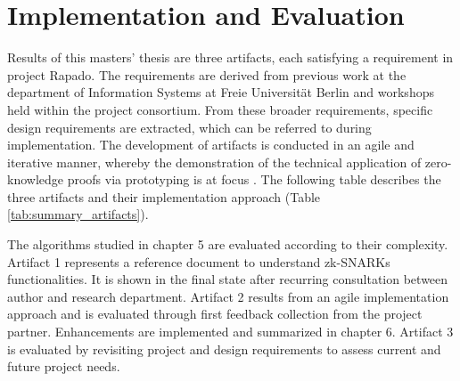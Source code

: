 \section{Implementation and Evaluation}
Results of this masters' thesis are three artifacts, each satisfying a requirement in project Rapado. The requirements are derived from previous work at the department of Information Systems at Freie Universit{\"a}t Berlin and workshops held within the project consortium. From these broader requirements, specific design requirements are extracted, which can be referred to during implementation. The development of artifacts is conducted in an agile and iterative manner, whereby the demonstration of the technical application of zero-knowledge proofs via prototyping is at focus \citep{mci/Wilde2007}. The following table describes the three artifacts and their implementation approach (Table \ref{tab:summary_artifacts}). 

The algorithms studied in chapter 5 are evaluated according to their complexity. Artifact 1 represents a reference document to understand zk-SNARKs functionalities. It is shown in the final state after recurring consultation between author and research department. Artifact 2 results from an agile implementation approach and is evaluated through first feedback collection from the project partner. Enhancements are implemented and summarized in chapter 6. Artifact 3 is evaluated by revisiting project and design requirements to assess current and future project needs. 

